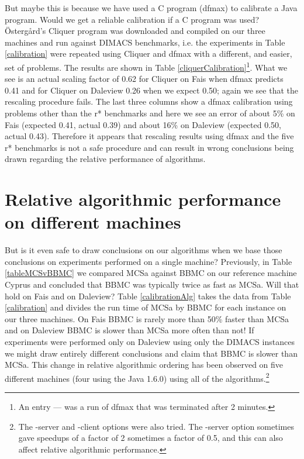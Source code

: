 \documentclass{l4proj}
\begin{document}
But maybe this is because we have used a C program (dfmax) to calibrate a Java program. Would we get a reliable calibration if a C 
program was used? \"{O}sterg\aa{}rd's Cliquer program was downloaded and compiled on our three machines and run against
DIMACS benchmarks, i.e. the experiments in Table \ref{calibration} were repeated using Cliquer and dfmax with a different, and easier, 
set of problems. The results are shown
in Table \ref{cliquerCalibration}\footnote{An entry --- was a run of dfmax that was terminated after 2 minutes.}. What we see is an actual 
scaling factor of 0.62 for Cliquer on Fais when dfmax predicts 0.41 
and for Cliquer on Daleview 0.26 when we expect 0.50; again we see that the rescaling procedure fails. The last three
columns show a dfmax calibration using problems other than the r* benchmarks and here we see an
error of about 5\% on Fais (expected 0.41, actual 0.39) and  about 16\% on Daleview (expected 0.50, actual 0.43). 
Therefore it appears that rescaling results using dfmax and the five r* benchmarks is not a safe procedure and can result in wrong
conclusions being drawn regarding the relative performance of algorithms.

\section{Relative algorithmic performance on different machines}
But is it even safe to draw conclusions on our algorithms when we base those conclusions on experiments
performed on a single machine? Previously, in Table \ref{tableMCSvBBMC} we compared MCSa against BBMC on our
reference machine Cyprus and concluded that BBMC was typically twice as fast as MCSa. Will that hold on
Fais and on Daleview? Table \ref{calibrationAlg} takes the data from Table \ref{calibration} and divides the
run time of MCSa by BBMC for each instance on our three machines. 
On Fais BBMC is rarely more than 50\% faster than MCSa and on Daleview BBMC is slower than MCSa more often than not! 
If experiments were performed
only on Daleview using only the DIMACS instances we might draw entirely different conclusions and claim that BBMC is slower than MCSa.
This change in relative algorithmic ordering has been observed on five different machines (four using the Java 1.6.0) 
using all of the algorithms.\footnote{The -server and -client options were also tried. The -server option sometimes
gave speedups of a factor of 2 sometimes a factor of 0.5, and this can also affect relative algorithmic performance.}
\end{document}
